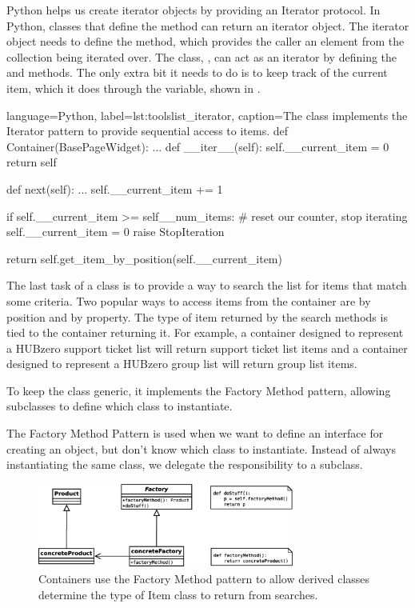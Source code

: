 Python helps us create iterator objects by providing an Iterator protocol. In
Python, classes that define the  method can return an
iterator object.  The iterator object needs to define the 
method, which provides the caller an element from the collection being iterated
over. The  class, , can act as an
iterator by defining the  and 
methods. The only extra bit it needs to do is to keep track of the current
item, which it does through the  variable, shown
in .


\begin{xcode}{%
  language=Python,%
  label=lst:toolslist_iterator,%
  caption={The  class implements the Iterator pattern %
           to provide sequential access to items.}%
}
def Container(BasePageWidget):
    ...
    def __iter__(self):
        self.__current_item = 0
        return self

    def next(self):
        ...
        self.__current_item += 1

        if self.__current_item >= self__num_items:
            # reset our counter, stop iterating
            self.__current_item = 0
            raise StopIteration

        return self.get_item_by_position(self.__current_item)
\end{xcode}

The last task of a  class is to provide a way to search the
list for items that match some criteria. Two popular ways to access items from
the container are by position and by property.  The type of item returned by the
search methods is tied to the container returning it.  For example, a container
designed to represent a HUBzero support ticket list will return support ticket
list items and a container designed to represent a HUBzero group list will
return group list items.

To keep the  class generic, it implements the Factory Method
pattern, allowing subclasses to define which  class to
instantiate.

The Factory Method Pattern is used when we want to define an interface for
creating an object, but don't know which class to instantiate. Instead of
always instantiating the same class, we delegate the responsibility to a
subclass.

\begin{figure}[tbh]
  \centering
  \includegraphics[width=0.75\textwidth]
    {../../diagrams/factory_method_pattern.png}
  \caption{ Containers use the Factory Method pattern to allow derived %
            classes determine the type of Item class to return from searches. }
  \label{fig:factory_method_pattern}
\end{figure}

